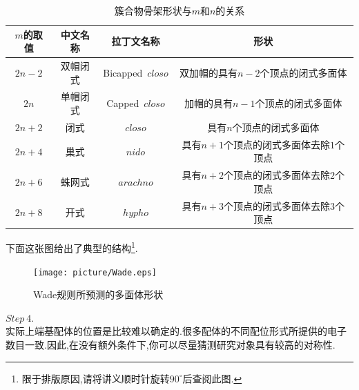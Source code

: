 \documentclass{ctexart}
\begin{document}
\begin{table}[H]
    \centering\begin{tabular}{|c|c|c|c|}
        \hline
        $m$的取值   &中文名称   &拉丁文名称 &形状\\\hline
        $2n-2$  &双帽闭式   &Bicapped\ $\mathit{closo}$ & 双加帽的具有$n-2$个顶点的闭式多面体 \\\hline
        $2n$  &单帽闭式   &Capped\ $\mathit{closo}$ & 加帽的具有$n-1$个顶点的闭式多面体 \\\hline
        $2n+2$  &闭式   &$\mathit{closo}$ & 具有$n$个顶点的闭式多面体 \\\hline
        $2n+4$  &巢式   &$\mathit{nido}$ & 具有$n+1$个顶点的闭式多面体去除$1$个顶点 \\\hline
        $2n+6$  &蛛网式   &$\mathit{arachno}$ & 具有$n+2$个顶点的闭式多面体去除$2$个顶点 \\\hline
        $2n+8$  &开式   &$\mathit{hypho}$ & 具有$n+3$个顶点的闭式多面体去除$3$个顶点 \\\hline
    \end{tabular}
    \caption{簇合物骨架形状与$m$和$n$的关系}
\end{table}
下面这张图给出了典型的结构\footnote{限于排版原因,请将讲义顺时针旋转$90^\circ$后查阅此图.}.
\begin{figure}[H]
    \centering\texttt{[image: picture/Wade.eps]}\caption{Wade规则所预测的多面体形状}
\end{figure}
\indent $\mathit{Step\ 4.}$\ \\
\indent 实际上端基配体的位置是比较难以确定的.很多配体的不同配位形式所提供的电子数目一致.因此,在没有额外条件下,你可以尽量猜测研究对象具有较高的对称性.
\end{document}
